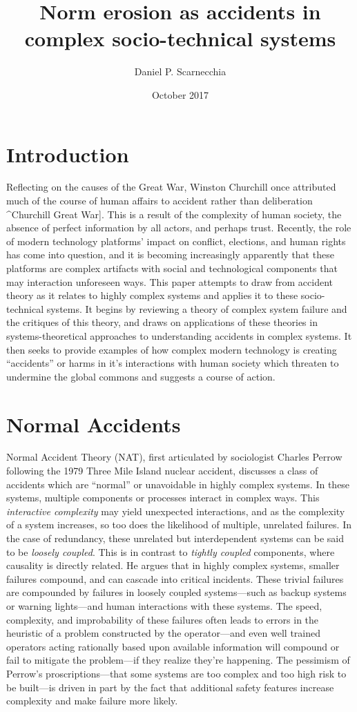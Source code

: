\documentclass[10pt,twocolumn]{article}   	%
\title{Norm erosion as accidents in complex socio-technical systems}
\author{Daniel P. Scarnecchia}
\date{October 2017}							%
\begin{document}
\maketitle
\section{Introduction}
Reflecting on the causes of the Great War, Winston Churchill once
attributed much of the course of human affairs to accident rather than
deliberation \cite{}\^{}Churchill Great War{]}. This is a result of the
complexity of human society, the absence of perfect information by all
actors, and perhaps trust. Recently, the role of modern technology
platforms' impact on conflict, elections, and human rights has come into
question, and it is becoming increasingly apparently that these
platforms are complex artifacts with social and technological components
that may interaction unforeseen ways. This paper attempts to draw from
accident theory as it relates to highly complex systems and applies it
to these socio-technical systems. It begins by reviewing a theory of
complex system failure and the critiques of this theory, and draws on
applications of these theories in systems-theoretical approaches to
understanding accidents in complex systems. It then seeks to provide
examples of how complex modern technology is creating ``accidents'' or
harms in it's interactions with human society which threaten to
undermine the global commons and suggests a course of action.

\section{Normal Accidents}\label{normal-accidents}

Normal Accident Theory (NAT), first articulated by sociologist Charles
Perrow following the 1979 Three Mile Island nuclear accident, discusses
a class of accidents which are ``normal'' or unavoidable in highly
complex systems.\cite{Perrow1999} In these systems, multiple components or
processes interact in complex ways. This \emph{interactive complexity}
may yield unexpected interactions, and as the complexity of a system
increases, so too does the likelihood of multiple, unrelated failures.
In the case of redundancy, these unrelated but interdependent systems
can be said to be \emph{loosely coupled}. This is in contrast to
\emph{tightly coupled} components, where causality is directly
related.\cite[p. 6-8]{Perrow1999} He argues that in highly complex systems, smaller
failures compound, and can cascade into critical incidents. These
trivial failures are compounded by failures in loosely coupled
systems---such as backup systems or warning lights---and human
interactions with these systems. The speed, complexity, and
improbability of these failures often leads to errors in the heuristic
of a problem constructed by the operator---and even well trained
operators acting rationally based upon available information will
compound or fail to mitigate the problem---if they realize they're
happening. The pessimism of Perrow's proscriptions---that some systems
are too complex and too high risk to be built---is driven in part by the
fact that additional safety features increase complexity and make
failure more likely.
\end{document}

